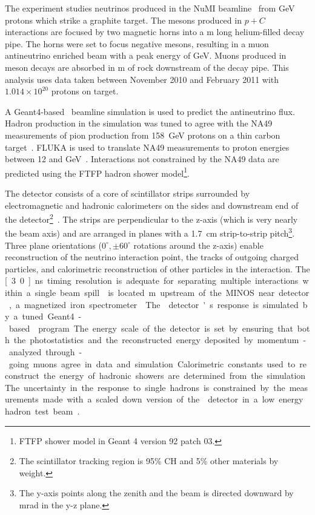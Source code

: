 
The \minerva experiment studies neutrinos produced in the NuMI beamline~\cite{Anderson:1998zza} from \unit[120]{GeV} protons which strike a graphite target.   The mesons produced in $p+C$ interactions are focused by two magnetic horns into a \unit[675]{m} long helium-filled decay pipe.  The horns were set to focus negative mesons, resulting in a muon antineutrino enriched beam with a peak energy of \unit[3]{GeV}.  Muons produced in meson decays are absorbed in \unit[240]{m} of rock downstream of the decay pipe. This analysis uses data taken between November 2010 and February 2011 with $1.014\times 10^{20}$ protons on target.

A Geant4-based~\cite{1610988,Agostinelli2003250} beamline simulation 
is used to predict the antineutrino flux.  Hadron production in the simulation 
was tuned to agree with the NA49 measurements of pion production
from 158~GeV protons on a thin carbon target~\cite{Alt:2006fr}. FLUKA is used to
translate NA49 measurements to proton energies between 
12 and \unit[120]{GeV}~\cite{Ferrari:2005zk,Battistoni:2007zzb}.  
Interactions not constrained by the NA49 data are predicted using the 
FTFP hadron shower model\footnote{{F}TFP shower model in Geant 4 version 92 patch 03.}.

The \minerva detector consists of a core of scintillator
strips surrounded by electromagnetic and hadronic calorimeters on the
sides and downstream end of the detector\footnote{The \minerva scintillator tracking region is 95\% CH and 5\% other materials by weight.}~\cite{minerva_nim}.  The strips are perpendicular to the z-axis (which is very nearly the beam axis) and are arranged in planes with a 1.7~cm strip-to-strip pitch\footnote{The y-axis points along the zenith and the beam is directed downward by \unit[58]{mrad} in the y-z plane.}. Three plane orientations ($0^\circ, \pm 60^\circ$ rotations around the z-axis) enable reconstruction of the neutrino
interaction point, the tracks of outgoing charged particles, and calorimetric
reconstruction of other particles in the interaction.  The \unit[3.0]{ns}
timing resolution is adequate for separating multiple interactions within a
single beam spill.  

\minerva is located \unit[2]{m} upstream of the MINOS near detector, 
a magnetized iron spectrometer~\cite{Michael:2008bc}.  
The \minerva detector's response is simulated by a tuned 
Geant4-based~\cite{Agostinelli2003250,1610988} program.  
The energy scale of the detector is set by ensuring
that both the photostatistics and the reconstructed energy deposited by
momentum-analyzed through-going muons agree in data and simulation.
Calorimetric constants used to reconstruct the energy of hadronic showers 
are determined from the simulation. The uncertainty in the response 
to single hadrons is constrained by the measurements made with a 
scaled down version of the \minerva detector in a 
low energy hadron test beam~\cite{minerva_nim}.

